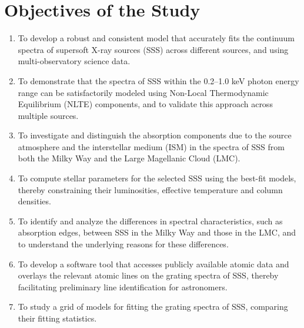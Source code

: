     \section{Objectives of the Study} \label{introduction:objectives}
    	\begin{enumerate}
    		\item To develop a robust and consistent model that accurately fits the continuum spectra of supersoft X-ray sources (SSS) across different sources, and using multi-observatory science data.
    		
    		\item To demonstrate that the spectra of SSS within the 0.2--1.0 keV photon energy range can be satisfactorily modeled using Non-Local Thermodynamic Equilibrium (NLTE) components, and to validate this approach across multiple sources.
    		
    		\item To investigate and distinguish the absorption components due to the source atmosphere and the interstellar medium (ISM) in the spectra of SSS from both the Milky Way and the Large Magellanic Cloud (LMC).
    		
    		\item To compute stellar parameters for the selected SSS using the best-fit models, thereby constraining their luminosities, effective temperature and column densities.
    		
    		
    		\item To identify and analyze the differences in spectral characteristics, such as absorption edges, between SSS in the Milky Way and those in the LMC, and to understand the underlying reasons for these differences.
    		
    		\item To develop a software tool that accesses publicly available atomic data and overlays the relevant atomic lines on the grating spectra of SSS, thereby facilitating preliminary line identification for astronomers.
    		
    		\item To study a grid of models for fitting the grating spectra of SSS, comparing their fitting statistics.
    	\end{enumerate}
